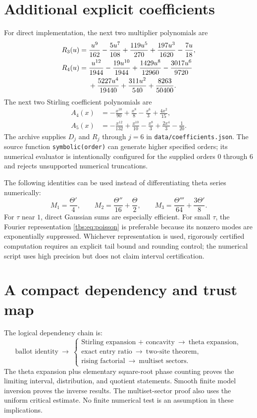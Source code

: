 \documentclass[11pt,a4paper]{article}
\numberwithin{equation}{section}
\theoremstyle{definition}
\newcommand{\code}[1]{\texttt{#1}}
\begin{document}
\section{Additional explicit coefficients}\label{tbs:app:coefficients}
For direct implementation, the next two multiplier polynomials are
\begin{align}
 R_3(u)={}&\frac{u^9}{162}-\frac{5u^7}{108}
 +\frac{119u^5}{270}+\frac{197u^3}{1620}-\frac{7u}{18},
 \label{tbs:eq:R3}\\
 R_4(u)={}&\frac{u^{12}}{1944}-\frac{19u^{10}}{1944}
 +\frac{1429u^8}{12960}-\frac{3017u^6}{9720}\notag\\
 &+\frac{5227u^4}{19440}+\frac{311u^2}{540}
 +\frac{8263}{50400}.\label{tbs:eq:R4}
\end{align}
The next two Stirling coefficient polynomials are
\begin{align}
 A_4(x)&=-\frac{x^{10}}{90}+\frac{x^8}{8}-\frac{x^6}{3}
                           +\frac{4x^2}{15},\label{tbs:eq:A4}\\
 A_5(x)&=-\frac{x^{12}}{132}+\frac{x^{10}}{10}-\frac{x^8}{3}
                           +\frac{2x^4}{3}-\frac1{20}.\label{tbs:eq:A5}
\end{align}
The archive supplies $D_j$ and $R_j$ through $j=6$ in
\code{data/coefficients.json}. The source function
\code{symbolic(order)} can generate higher specified orders; its
numerical evaluator is intentionally configured for the supplied orders
$0$ through $6$ and rejects unsupported numerical truncations.

The following identities can be used instead of differentiating theta
series numerically:
\[
 M_1=\frac{\Theta'}4,\qquad
 M_2=\frac{\Theta''}{16}+\frac{\Theta}{2},\qquad
 M_3=\frac{\Theta'''}{64}+\frac{3\Theta'}8.
\]
For $\tau$ near $1$, direct Gaussian sums are especially efficient.
For small $\tau$, the Fourier representation \eqref{tbs:eq:poisson} is
preferable because its nonzero modes are exponentially suppressed.
Whichever representation is used, rigorously certified computation
requires an explicit tail bound and rounding control; the numerical
script uses high precision but does not claim interval certification.

\section{A compact dependency and trust map}\label{tbs:app:trust}
The logical dependency chain is:
\[
 \text{ballot identity}\ \longrightarrow\
 \begin{cases}
  \text{Stirling expansion + concavity}\ \longrightarrow\ \text{theta expansion},\\
  \text{exact entry ratio}\ \longrightarrow\ \text{two-site theorem},\\
  \text{rising factorial}\ \longrightarrow\ \text{multiset sectors}.
 \end{cases}
\]
The theta expansion plus elementary square-root phase counting proves
the limiting interval, distribution, and quotient statements. Smooth
finite model inversion proves the inverse results. The multiset-sector
proof also uses the uniform critical estimate. No finite numerical test
is an assumption in these implications.
\end{document}
